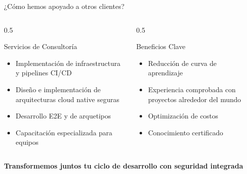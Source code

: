 \documentclass[aspectratio=169]{beamer}
\begin{document}
\begin{frame}{¿Cómo hemos apoyado a otros clientes?}
	
	\begin{columns}[T]
		\begin{column}{0.5\textwidth}
			\begin{block}{Servicios de Consultoría}
				\begin{itemize}
					\item \faUserShield \hspace{0.2em} Implementación de infraestructura y pipelines CI/CD
					\item \faProjectDiagram \hspace{0.2em} Diseño e implementación de arquitecturas cloud native seguras
					\item \faCode \hspace{0.2em} Desarrollo E2E y de arquetipos
					\item \faGraduationCap \hspace{0.2em} Capacitación especializada para equipos
				\end{itemize}
			\end{block}
		\end{column}
		
		\begin{column}{0.5\textwidth}
			\begin{block}{Beneficios Clave}
				\begin{itemize}
					\item \faRocket \hspace{0.2em} Reducción de curva de aprendizaje
					\item \faGlobe \hspace{0.2em} Experiencia comprobada con proyectos alrededor del mundo
					\item \faMoneyBillWave \hspace{0.2em} Optimización de costos
					\item \faCertificate \hspace{0.2em} Conocimiento certificado
				\end{itemize}
			\end{block}
		\end{column}
	\end{columns}
	
	\centering
	\large{\textbf{Transformemos juntos tu ciclo de desarrollo con seguridad integrada}}
\end{frame}
\end{document}
